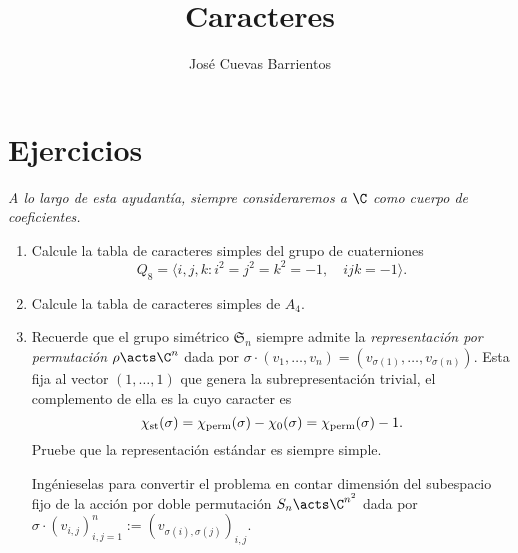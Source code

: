 \documentclass[11pt, reqno]{amsart}
\title{Caracteres}
\date{\DTMdate{2025-10-01}}
\author{José Cuevas Barrientos}
\begin{document}
\maketitle

\section{Ejercicios}
\begin{center}
	\slshape
	A lo largo de esta ayudantía, siempre consideraremos a $\C$ como cuerpo de coeficientes.
\end{center}
\begin{enumerate}
	\item Calcule la tabla de caracteres simples del grupo de cuaterniones
		\[
			Q_8 = \langle i, j, k : i^2 = j^2 = k^2 = -1, \quad ijk = -1 \rangle.
		\]

		\newex
	\item Calcule la tabla de caracteres simples de $A_4$.

		\newex
	\item\lookright Recuerde que el grupo simétrico $\mathfrak{S}_n$ siempre admite la \emph{representación por permutación} $\rho \acts
		\C^n$ dada por $\sigma \cdot (v_1, \dots, v_n) = (v_{\sigma(1)}, \dots, v_{\sigma(n)})$.
		Esta fija al vector $(1, \dots, 1)$ que genera la subrepresentación trivial, el complemento de ella es la
		 cuyo caracter es
		\[
			\chi_{\rm st}(\sigma) = \chi_{\rm perm}(\sigma) - \chi_0(\sigma) = \chi_{\rm perm}(\sigma) - 1.
		\]
		Pruebe que la representación estándar es siempre simple.
		\begin{hint}
			Ingénieselas para convertir el problema en contar dimensión del subespacio fijo de la acción por doble permutación
			$S_n \acts \C^{n^2}$ dada por $\sigma\cdot(v_{i,j})_{i,j=1}^n := (v_{\sigma(i), \sigma(j)})_{i,j}$.
		\end{hint}
\end{enumerate}
\end{document}
